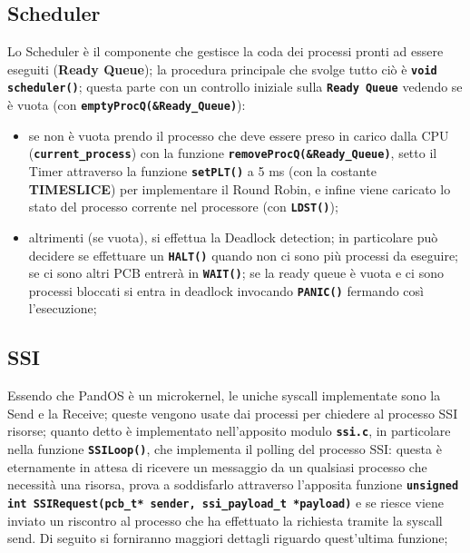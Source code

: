 \documentclass{article}
\begin{document}
\subsection{Scheduler}
Lo Scheduler è il componente che gestisce la coda dei processi pronti ad essere eseguiti (\textbf{Ready Queue}); la procedura principale che svolge tutto ciò è \texttt{\textbf{void scheduler()}}; questa parte con un controllo iniziale sulla \texttt{\textbf{Ready Queue}} vedendo se è vuota (con \texttt{\textbf{emptyProcQ(\&Ready\_Queue)}}):
\begin{itemize}
    \item se non è vuota prendo il processo che deve essere preso in carico dalla CPU (\texttt{\textbf{current\_process}}) con la funzione \texttt{\textbf{removeProcQ(\&Ready\_Queue)}}, setto il Timer attraverso la funzione \texttt{\textbf{setPLT()}} a 5 ms (con la costante \textbf{TIMESLICE}) per implementare il Round Robin, e infine viene caricato lo stato del processo corrente nel processore (con \texttt{\textbf{LDST()}});
    \item altrimenti (se vuota), si effettua la Deadlock detection; in particolare può decidere se effettuare un \texttt{\textbf{HALT()}} quando non ci sono più processi da eseguire; se ci sono altri PCB entrerà in \texttt{\textbf{WAIT()}}; se la ready queue è vuota e ci sono processi bloccati si entra in deadlock invocando \texttt{\textbf{PANIC()}} fermando così l'esecuzione;
\end{itemize}

\subsection{SSI}
Essendo che \textmu PandOS è un microkernel, le uniche syscall implementate sono la Send e la Receive; queste vengono usate dai processi per chiedere al processo SSI risorse; quanto detto è implementato nell'apposito modulo \texttt{\textbf{ssi.c}}, in particolare nella funzione \texttt{\textbf{SSILoop()}}, che implementa il polling del processo SSI: questa è eternamente in attesa di ricevere un messaggio da un qualsiasi processo che necessità una risorsa, prova a soddisfarlo attraverso l'apposita funzione \texttt{\textbf{unsigned int SSIRequest(pcb\_t* sender, ssi\_payload\_t *payload)}} e se riesce viene inviato un riscontro al processo che ha effettuato la richiesta tramite la syscall send. Di seguito si forniranno maggiori dettagli riguardo quest'ultima funzione;

\newpage
\end{document}
